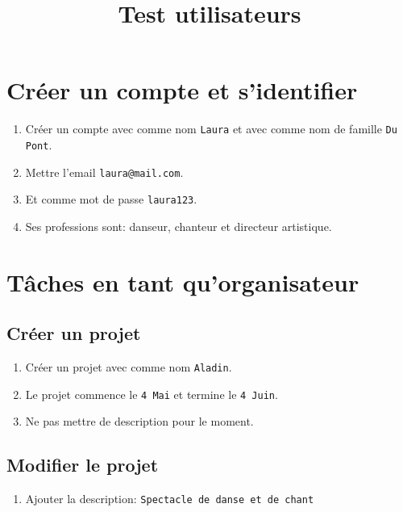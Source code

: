 \documentclass[11pt]{article}
\author{}
\begin{document}
\pagestyle{fancy}
\fancyhead{}


\title{\vspace{-1cm}\huge{Test utilisateurs}\vspace{-1.7cm}}
\date{}
\maketitle
\thispagestyle{fancy}
\section{Créer un compte et s'identifier}
\begin{enumerate}
    \item Créer un compte avec comme nom \texttt{Laura} et avec comme nom de famille \texttt{Du Pont}.
    \item Mettre l'email \texttt{laura@mail.com}.
    \item Et comme mot de passe \texttt{laura123}.
    \item Ses professions sont: danseur, chanteur et directeur artistique.
\end{enumerate}
\section{Tâches en tant qu'organisateur}
\subsection{Créer un projet}
\begin{enumerate}
    \item Créer un projet avec comme nom \texttt{Aladin}.
    \item Le projet commence le \texttt{4 Mai} et termine le \texttt{4 Juin}.
    \item Ne pas mettre de description pour le moment.
\end{enumerate}
\subsection{Modifier le projet}
\begin{enumerate}
    \item Ajouter la description: \texttt{Spectacle de danse et de chant}
\end{enumerate}
\end{document}
